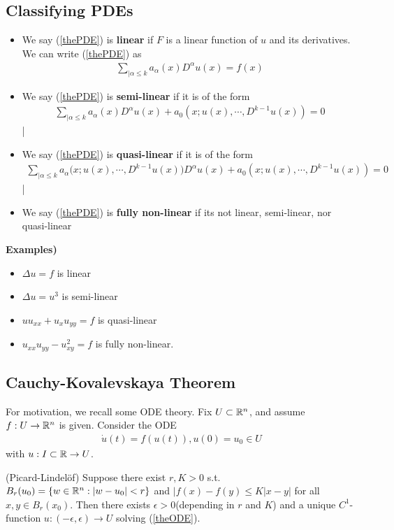 \documentclass[10pt,a4paper]{report}
\begin{document}
\subsection*{Classifying PDEs}
\begin{itemize}
\item We say (\ref{thePDE}) is \textbf{linear} if $F$ is a linear function of $u$ and its derivatives. We can write (\ref{thePDE}) as 
\begin{align*}
\sum_{|\alpha \leq k} a_{\alpha}(x) D^{\alpha}u(x) = f(x)
\end{align*}
\item We say (\ref{thePDE}) is \textbf{semi-linear} if it is of the form
\begin{align*}
\sum_{|\alpha \leq k} a_{\alpha}(x) D^{\alpha}u(x) + a_0(x;u(x),\cdots,D^{k-1}u(x)) = 0
\end{align*}|
\item We say (\ref{thePDE}) is \textbf{quasi-linear} if it is of the form
\begin{align*}
\sum_{|\alpha \leq k} a_{\alpha}\big(x;u(x),\cdots,D^{k-1}u(x) \big) D^{\alpha}u(x) + a_0(x;u(x),\cdots,D^{k-1}u(x)) = 0
\end{align*}|
\item We say (\ref{thePDE}) is \textbf{fully non-linear} if its not linear, semi-linear, nor quasi-linear
\end{itemize}
\s

\textbf{Examples)}
\begin{itemize}
\item $\Delta u = f$ is linear
\item $\Delta u =u^3$ is semi-linear
\item $uu_{xx} + u_x u_{yy} = f$ is quasi-linear
\item $u_{xx}u_{yy} - u_{xy}^2 = f$ is fully non-linear.
\end{itemize}
\s

\subsection*{Cauchy-Kovalevskaya Theorem}
For motivation, we recall some ODE theory. Fix $U \subset \mathbb{R}^n$, and assume $f:U \rightarrow \mathbb{R}^n$ is given. Consider the ODE
\begin{align}
\dot{u}(t) = f(u(t)), u(0)=u_0 \in U \label{theODE}
\end{align}
with $u : I \subset \mathbb{R} \rightarrow U$.
\s

\thm (Picard-Lindel\"{o}f) Suppose there exist $r,K>0$ s.t. $B_r(u_0) = \{ w\in \mathbb{R}^n : |w-u_0|<r\}$ and $|f(x)-f(y) \leq K|x-y|$ for all $x,y \in B_r(x_0)$. Then there exists $\epsilon >0$(depending in $r$ and $K$) and a unique $C^1$-function $u : (-\epsilon,\epsilon)\rightarrow U$ solving (\ref{theODE}).
\end{document}
